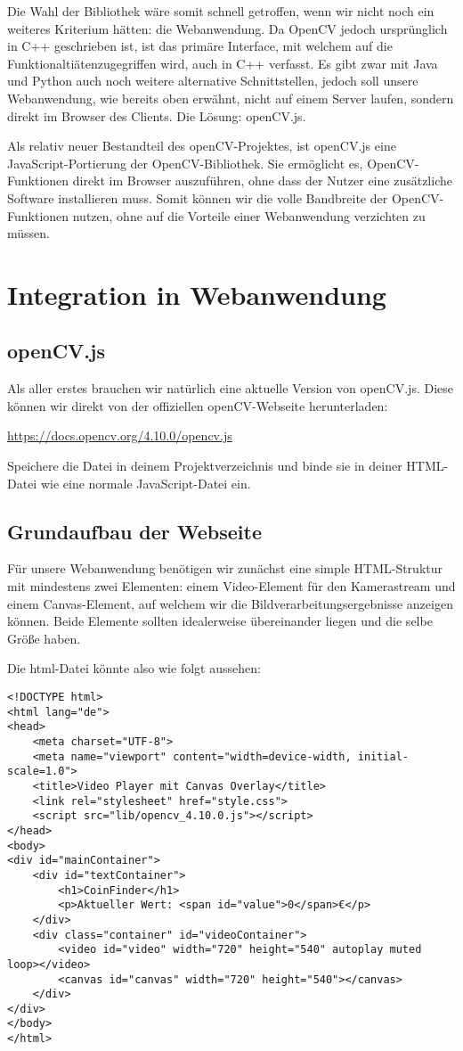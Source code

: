 \documentclass{article}
\begin{document}
Die Wahl der Bibliothek wäre somit schnell getroffen, wenn wir nicht noch ein weiteres Kriterium hätten: die Webanwendung. Da OpenCV jedoch ursprünglich in C++ geschrieben ist, ist das primäre Interface, mit welchem auf die Funktionaltiätenzugegriffen wird, auch in C++ verfasst. Es gibt zwar mit Java und Python auch noch weitere alternative Schnittstellen, jedoch soll unsere Webanwendung, wie bereits oben erwähnt, nicht auf einem Server laufen, sondern direkt im Browser des Clients. Die Lösung: openCV.js.

Als relativ neuer Bestandteil des openCV-Projektes, ist openCV.js eine JavaScript-Portierung der OpenCV-Bibliothek. Sie ermöglicht es, OpenCV-Funktionen direkt im Browser auszuführen, ohne dass der Nutzer eine zusätzliche Software installieren muss. Somit können wir die volle Bandbreite der OpenCV-Funktionen nutzen, ohne auf die Vorteile einer Webanwendung verzichten zu müssen.

\section{Integration in Webanwendung}
\subsection{openCV.js}
Als aller erstes brauchen wir natürlich eine aktuelle Version von openCV.js. Diese können wir direkt von der offiziellen openCV-Webseite herunterladen:

\href{https://docs.opencv.org/4.10.0/opencv.js}{https://docs.opencv.org/4.10.0/opencv.js}

Speichere die Datei in deinem Projektverzeichnis und binde sie in deiner HTML-Datei wie eine normale JavaScript-Datei ein.

\subsection{Grundaufbau der Webseite}
Für unsere Webanwendung benötigen wir zunächst eine simple HTML-Struktur mit mindestens zwei Elementen: einem Video-Element für den Kamerastream und einem Canvas-Element, auf welchem wir die Bildverarbeitungsergebnisse anzeigen können. Beide Elemente sollten idealerweise übereinander liegen und die selbe Größe haben.

Die html-Datei könnte also wie folgt aussehen:
\begin{lstlisting}[style=HTML]
<!DOCTYPE html>
<html lang="de">
<head>
    <meta charset="UTF-8">
    <meta name="viewport" content="width=device-width, initial-scale=1.0">
    <title>Video Player mit Canvas Overlay</title>
    <link rel="stylesheet" href="style.css">
    <script src="lib/opencv_4.10.0.js"></script>
</head>
<body>
<div id="mainContainer">
    <div id="textContainer">
        <h1>CoinFinder</h1>
        <p>Aktueller Wert: <span id="value">0</span>€</p>
    </div>
    <div class="container" id="videoContainer">
        <video id="video" width="720" height="540" autoplay muted loop></video>
        <canvas id="canvas" width="720" height="540"></canvas>
    </div>
</div>
</body>
</html>
\end{lstlisting}
\end{document}
